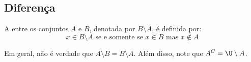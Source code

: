 \subsection{Diferença}

\begin{definition}
A  entre os conjuntos $A$ e $B$, denotada por $B\setminus A$, é definida por:
%
	$$ x \in  B \setminus A \text{ se e somente se }  x \in B \text{ mas } x \notin A $$
\end{definition}
\begin{remark}
Em geral, não é verdade que $A \setminus B = B \setminus A$. Além disso, note que $A^C = \U\setminus A$.
\end{remark}


